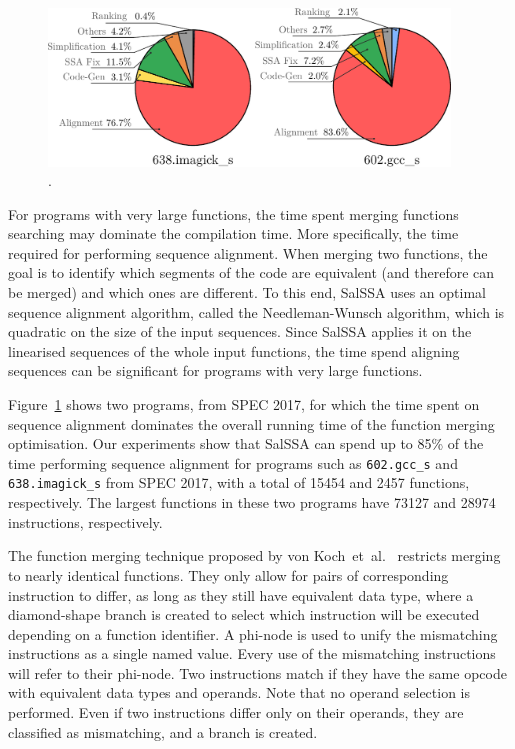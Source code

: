 \begin{figure}[h]
  \centering
  \includegraphics[width=0.95\textwidth]{src/fastfm/figs/compilation-breakdown-motivation-alignment.pdf}
  \caption{.}
  \label{fig:compilation-breakdown-motivation-alignment}
\end{figure}


For programs with very large functions, the time spent merging functions searching may dominate the compilation time.
More specifically, the time required for performing sequence alignment.
When merging two functions, the goal is to identify which segments of the code are equivalent (and therefore can be merged) and which ones are different.
To this end, SalSSA uses an optimal sequence alignment algorithm, called the Needleman-Wunsch algorithm, which is quadratic on the size of the input sequences.
Since SalSSA applies it on the linearised sequences of the whole input functions, the time spend aligning sequences can be significant for programs with very large functions.

Figure~\ref{fig:compilation-breakdown-motivation-alignment} shows two programs, from SPEC 2017, for which the time spent on sequence alignment dominates the overall running time of the function merging optimisation.
Our experiments show that SalSSA can spend up to 85\% of the time performing sequence alignment for programs such as \texttt{602.gcc\_s} and \texttt{638.imagick\_s} from SPEC 2017, with a total of 15454 and 2457 functions, respectively.
The largest functions in these two programs have 73127 and 28974 instructions, respectively.




The function merging technique proposed by von Koch~et~al.~\cite{edler10} restricts merging to nearly identical functions.
They only allow for pairs of corresponding instruction to differ, as long as they still have equivalent data type, where a diamond-shape branch is created to select which instruction will be executed depending on a function identifier.
A phi-node is used to unify the mismatching instructions as a single named value.
Every use of the mismatching instructions will refer to their phi-node.
Two instructions match if they have the same opcode with equivalent data types and operands.
Note that no operand selection is performed.
Even if two instructions differ only on their operands, they are classified as mismatching, and a branch is created.

